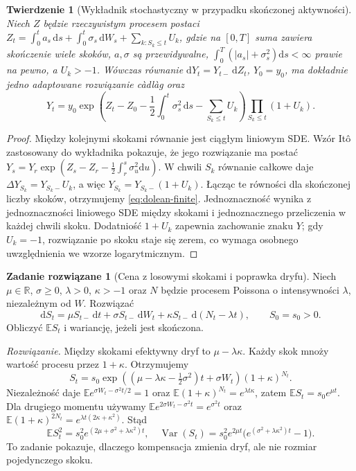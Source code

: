\documentclass[11pt,a4paper,oneside]{report}
\numberwithin{equation}{chapter}
\theoremstyle{plain}
\newtheorem{twierdzenie}{Twierdzenie}[chapter]
\theoremstyle{definition}
\newtheorem{zadanie}{Zadanie rozwiązane}[chapter]
\theoremstyle{remark}
\newcommand{\R}{\mathbb{R}}
\newcommand{\E}{\mathbb{E}}
\newcommand{\Var}{\operatorname{Var}}
\newcommand{\dd}{\mathrm{d}}
\begin{document}
\begin{twierdzenie}[Wykładnik stochastyczny w przypadku skończonej aktywności]
\label{th:dolean-finite}
Niech $Z$ będzie rzeczywistym procesem postaci
$Z_t=\int_0^t a_s\,\dd s+\int_0^t\sigma_s\,\dd W_s
+\sum_{k:S_k\le t}U_k$, gdzie na $[0,T]$ suma zawiera
skończenie wiele skoków, $a,\sigma$ są przewidywalne,
$\int_0^T(|a_s|+\sigma_s^2)\dd s<\infty$ prawie na pewno, a
$U_k>-1$. Wówczas równanie
$\dd Y_t=Y_{t-}\,\dd Z_t$, $Y_0=y_0$, ma dokładnie jedno
adaptowane rozwiązanie càdlàg oraz
\[
Y_t=y_0\exp\left(Z_t-Z_0-\frac12\int_0^t\sigma_s^2\,\dd s
-\sum_{S_k\le t}U_k\right)
\prod_{S_k\le t}(1+U_k).
\tag{12.5}\label{eq:dolean-finite}
\]
\end{twierdzenie}
\begin{proof}
Między kolejnymi skokami równanie jest ciągłym liniowym
SDE. Wzór Itô zastosowany do wykładnika pokazuje,
że jego rozwiązanie ma postać
$Y_s=Y_r\exp(Z_s-Z_r-\frac12\int_r^s\sigma_u^2\dd u)$.
W chwili $S_k$ równanie całkowe daje
$\Delta Y_{S_k}=Y_{S_k-}U_k$, a więc
$Y_{S_k}=Y_{S_k-}(1+U_k)$.
Łącząc te równości dla skończonej liczby skoków,
otrzymujemy \eqref{eq:dolean-finite}. Jednoznaczność
wynika z jednoznaczności liniowego SDE między skokami
i jednoznacznego przeliczenia w każdej chwili skoku.
Dodatniość $1+U_k$ zapewnia zachowanie znaku $Y$;
gdy $U_k=-1$, rozwiązanie po skoku staje się zerem,
co wymaga osobnego uwzględnienia we wzorze logarytmicznym.
\end{proof}

\begin{zadanie}[Cena z losowymi skokami i poprawka dryfu]
Niech $\mu\in\R$, $\sigma\ge0$, $\lambda>0$, $\kappa>-1$
oraz $N$ będzie procesem Poissona o intensywności $\lambda$,
niezależnym od $W$. Rozwiązać
\[
\dd S_t=\mu S_{t-}\,\dd t+\sigma S_{t-}\,\dd W_t
+\kappa S_{t-}\,\dd(N_t-\lambda t),\qquad S_0=s_0>0.
\]
Obliczyć $\E S_t$ i wariancję, jeżeli jest skończona.

\emph{Rozwiązanie.} Między skokami efektywny dryf to
$\mu-\lambda\kappa$. Każdy skok mnoży wartość procesu
przez $1+\kappa$. Otrzymujemy
\[
S_t=s_0\exp\left((\mu-\lambda\kappa-\tfrac12\sigma^2)t
+\sigma W_t\right)(1+\kappa)^{N_t}.
\]
Niezależność daje
$\E e^{\sigma W_t-\sigma^2t/2}=1$ oraz
$\E(1+\kappa)^{N_t}=e^{\lambda t\kappa}$,
zatem $\E S_t=s_0e^{\mu t}$.
Dla drugiego momentu używamy
$\E e^{2\sigma W_t-\sigma^2t}=e^{\sigma^2t}$ oraz
$\E(1+\kappa)^{2N_t}=e^{\lambda t(2\kappa+\kappa^2)}$.
Stąd
\[
\E S_t^2=s_0^2e^{(2\mu+\sigma^2+\lambda\kappa^2)t},
\quad
\Var(S_t)=s_0^2e^{2\mu t}
\bigl(e^{(\sigma^2+\lambda\kappa^2)t}-1\bigr).
\]
To zadanie pokazuje, dlaczego kompensacja zmienia dryf,
ale nie rozmiar pojedynczego skoku.
\end{zadanie}
\end{document}
